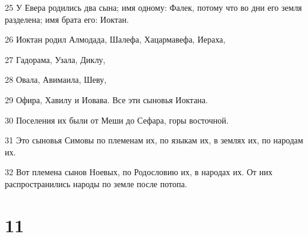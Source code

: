 \par 25 У Евера родились два сына; имя одному: Фалек, потому что во дни его земля разделена; имя брата его: Иоктан.
\par 26 Иоктан родил Алмодада, Шалефа, Хацармавефа, Иераха,
\par 27 Гадорама, Узала, Диклу,
\par 28 Овала, Авимаила, Шеву,
\par 29 Офира, Хавилу и Иовава. Все эти сыновья Иоктана.
\par 30 Поселения их были от Меши до Сефара, горы восточной.
\par 31 Это сыновья Симовы по племенам их, по языкам их, в землях их, по народам их.
\par 32 Вот племена сынов Ноевых, по Родословию их, в народах их. От них распространились народы по земле после потопа.

\chapter{11}

